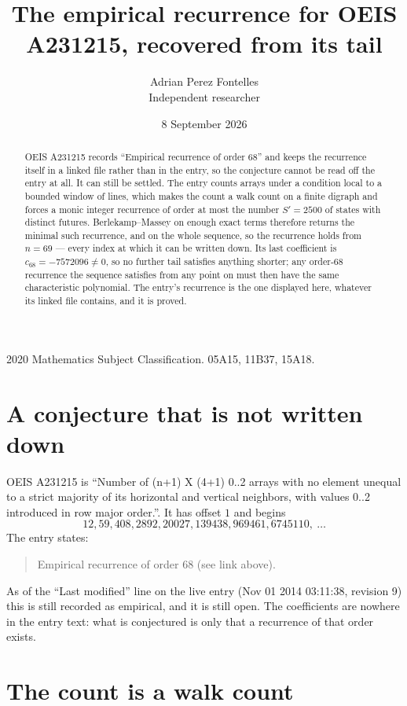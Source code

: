 \documentclass[11pt,a4paper]{article}
\title{The empirical recurrence for OEIS A231215, recovered from its tail}
\author{Adrian Perez Fontelles\\ \small Independent researcher}
\date{8 September 2026}
\theoremstyle{plain}
\theoremstyle{definition}
\begin{document}
\maketitle

\begin{abstract}
OEIS A231215 records ``Empirical recurrence of order $68$'' and keeps the recurrence itself in
a linked file rather than in the entry, so the conjecture cannot be read off the entry at all.
It can still be settled. The entry counts arrays under a condition local to a bounded window of
lines, which makes the count a walk count on a finite digraph and forces a monic integer
recurrence of order at most the number $S'=2500$ of states with distinct futures. Berlekamp--Massey on
enough exact terms therefore returns the minimal such recurrence, and on the whole sequence, so the recurrence holds from $n=69$ --- every index at which it can be written down.
Its last coefficient is $c_{68}=-7572096\neq0$, so no further tail satisfies anything
shorter; any order-$68$ recurrence the sequence satisfies from any point on must then have
the same characteristic polynomial. The entry's recurrence is the one displayed here, whatever
its linked file contains, and it is proved.
\end{abstract}

\noindent\small 2020 Mathematics Subject Classification. 05A15, 11B37, 15A18.\normalsize

\section{A conjecture that is not written down}

OEIS A231215 is ``Number of (n+1) X (4+1) 0..2 arrays with no element unequal to a strict majority of its horizontal and vertical neighbors, with values 0..2 introduced in row major order.''. It has offset $1$ and begins
\[
12, 59, 408, 2892, 20027, 139438, 969461, 6745110,\ \dots
\]
The entry states:
\begin{quote}
Empirical recurrence of order 68 (see link above).
\end{quote}
As of the ``Last modified'' line on the live entry (Nov 01 2014 03:11:38, revision 9)
this is still recorded as empirical, and it is still open. The coefficients are nowhere in the
entry text: what is conjectured is only that a recurrence of that order exists.

\section{The count is a walk count}
\end{document}
